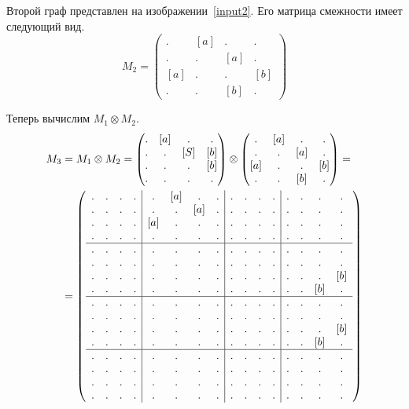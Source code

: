Второй граф представлен на изображении~\ref{input2}. 
Его матрица смежности имеет следующий вид.
$$ M_2 =
\begin{pmatrix} 
. & [a] & . & . \\
. & . & [a] & . \\
[a] & . & . & [b] \\
. & . & [b] & . 
\end{pmatrix}
$$

Теперь вычислим $M_1 \otimes M_2$.
\begin{align}
M_3 &= M_1 \otimes M_2 = 
\begin{pmatrix} 
. & [a] & . & . \\
. & . & [S] & [b] \\
. & . & . & [b] \\
. & . & . & . 
\end{pmatrix}
\otimes 
\begin{pmatrix} 
. & [a] & . & . \\
. & . & [a] & . \\
[a] & . & . & [b] \\
. & . & [b] & . 
\end{pmatrix}
=\notag\\
&=
\label{eq:graph_tm}
\left(\begin{array}{c c c c | c c c c | c c c c | c c c c } 
. & . & . & .  &  .   & [a] & .   & .  &  . & . & . & .  &  . & . & . & .   \\
. & . & . & .  &  .   & .   & [a] & .  &  . & . & . & .  &  . & . & . & .   \\
. & . & . & .  &  [a] & .   & .   & .  &  . & . & . & .  &  . & . & . & .   \\
. & . & . & .  &  .   & .   & .   & .  &  . & . & . & .  &  . & . & . & .   \\
\hline
. & . & . & .  &  . & . & . & .    &  . & . & . & .  &  . & . & . & .   \\
. & . & . & .  &  . & . & . & .    &  . & . & . & .  &  . & . & . & .   \\
. & . & . & .  &  . & . & . & .    &  . & . & . & .  &  . & . & . & [b] \\
. & . & . & .  &  . & . & . & .    &  . & . & . & .  &  . & . & [b] & . \\
\hline
. & . & . & .  &  . & . & . & .    &  . & . & . & .  &  . & . & . & .   \\
. & . & . & .  &  . & . & . & .    &  . & . & . & .  &  . & . & . & .   \\
. & . & . & .  &  . & . & . & .    &  . & . & . & .  &  . & . & . & [b] \\
. & . & . & .  &  . & . & . & .    &  . & . & . & .  &  . & . & [b] & . \\
\hline
. & . & . & .  &  . & . & . & .    &  . & . & . & .  &  . & . & . & .   \\
. & . & . & .  &  . & . & . & .    &  . & . & . & .  &  . & . & . & .   \\
. & . & . & .  &  . & . & . & .    &  . & . & . & .  &  . & . & . & .   \\
. & . & . & .  &  . & . & . & .    &  . & . & . & .  &  . & . & . & . 
\end{array}\right)
\end{align}

